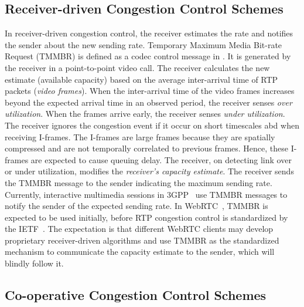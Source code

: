 \subsection{Receiver-driven Congestion Control Schemes}

In receiver-driven congestion control, the receiver estimates the rate and
notifies the sender about the new sending rate. Temporary Maximum Media 
Bit-rate Request (TMMBR) is defined as a codec control message in \cite{rfc5104}.
It is generated by the receiver in a point-to-point video call. The receiver
calculates the new estimate (available capacity) based on the average 
inter-arrival time of RTP packets (\emph{video frames}). When the inter-arrival time
of the video frames increases beyond the expected arrival time in an observed
period, the receiver senses \emph{over utilization}. When the frames arrive early, the
receiver senses \emph{under utilization}. The receiver ignores the congestion event 
if it occur on short timescales abd when receiving I-frames. 
The I-frames are large frames because they are spatially compressed and
are not temporally correlated to previous frames. Hence, these I-frames are
expected to cause queuing delay. The receiver, on detecting link over
or under utilization, modifies the \emph{receiver's capacity estimate}. 
The receiver sends the TMMBR message to the sender
indicating the maximum sending rate. Currently, interactive multimedia sessions
in 3GPP~\cite{3gpp.26.114} use TMMBR messages to notify the sender of the
expected sending rate. In WebRTC~\cite{jennings:2013:webrtc}, TMMBR is
expected to be used initially, before RTP congestion control is standardized
by the IETF~\cite{rtp-usage}. The expectation is that different WebRTC clients
may develop proprietary receiver-driven algorithms and use TMMBR as the
standardized mechanism to communicate the capacity estimate to the sender,
which will blindly follow it.


\subsection{Co-operative Congestion Control Schemes}
\label{cc:co-op}

